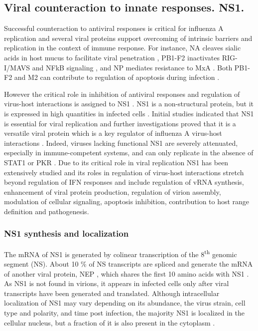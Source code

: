 		
	\subsection{Viral counteraction to innate responses. NS1.}
	
	Successful counteraction to antiviral responses is critical for influenza A replication and several viral proteins support overcoming of intrinsic barriers and replication in the context of immune response. For instance, \gls{NA} cleaves sialic acids in host mucus to facilitate viral penetration \parencite{Cohen2013}, \gls{PB1}-F2 inactivates \gls{RIG-I}/\gls{MAVS} and \gls{NFkB} signaling \parencite{Varga2011, Dudek2011, Reis2013}, and \gls{NP} mediates resistance to \gls{MxA} \parencite{Dittmann2008}. Both \gls{PB1}-F2 and \gls{M2} can contribute to regulation of apoptosis during infection \parencite{Herold2012}. 
	
	However the critical role in inhibition of antiviral responses and regulation of virus-host interactions is assigned to \gls{NS1} \parencite{Garcia-Sastre1998}. \gls{NS1} is a non-structural protein, but it is expressed in high quantities in infected cells \parencite{Ritchey1976}. Initial studies indicated that \gls{NS1} is essential for viral replication \parencite{Koennecke1981} and further investigations proved that it is a versatile viral protein which is a key regulator of influenza A virus-host interactions \parencite{Ayllon2015}. Indeed, viruses lacking functional \gls{NS1} are severely attenuated, especially in immune-competent systems, and can only replicate in the absence of \gls{STAT}1 or \gls{PKR} \parencite{Garcia-Sastre1998, Egorov1998, Donelan2003, Falcon2004}. Due to its critical role in viral replication \gls{NS1} has been extensively studied and its roles in regulation of virus-host interactions stretch beyond regulation of \gls{IFN} responses and include regulation of vRNA synthesis, enhancement of viral protein production, regulation of virion assembly, modulation of cellular signaling, apoptosis inhibition, contribution to host range definition and pathogenesis. 
		
		
		\subsubsection{NS1 synthesis and localization}
		
		The mRNA of \gls{NS1} is generated by colinear transcription of the 8\textsuperscript{th} genomic segment (NS). About 10 \% of NS transcripts are spliced and generate the mRNA of another viral protein, \gls{NEP} \parencite{Lamb1980}, which shares the first 10 amino acids with \gls{NS1} \parencite{Inglis1979, Lamb1979, Lamb1980}. As \gls{NS1} is not found in virions, it appears in infected cells only after viral transcripts have been generated and translated. Although intracellular localization of \gls{NS1} may vary depending on its abundance, the virus strain, cell type and polarity, and time post infection, the majority \gls{NS1} is localized in the cellular nucleus, but a fraction of it is also present in the cytoplasm \parencite{Melen2007, Melen2012, Newby2007, Li1998, Greenspan1988}. 
		
